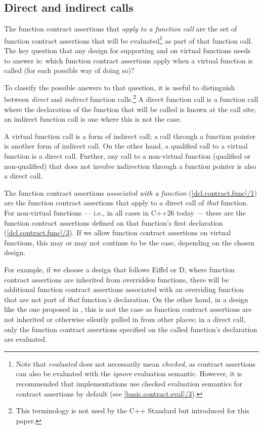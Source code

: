 \subsection{Direct and indirect calls}

The function contract assertions that \emph{apply to a function call} are the set of function contract assertions that will be evaluated\footnote{Note that \emph{evaluated} does not necessarily mean \emph{checked}, as contract assertions can also be evaluated with the \emph{ignore} evaluation semantic. However, it is recommended that implementations use checked evaluation semantics for contract assertions by default (see \href{https://eel.is/c++draft/basic.contract\#eval-3}{[basic.contract.eval]/3}).} as part of that function call. The key question that any design for supporting  and  on virtual functions needs to answer is: which function contract assertions apply when a virtual function is called (for each possible way of doing so)?

To classify the possible answers to that question, it is useful to distinguish between \emph{direct} and \emph{indirect} function calls.\footnote{This terminology is not used by the C++ Standard but introduced for this paper.} A direct function call is a function call where the declaration of the function that will be called is known at the call site; an indirect function call is one where this is not the case.

A virtual function call is a form of indirect call; a call through a function pointer is another form of indirect call. On the other hand, a qualified call to a virtual function is a direct call. Further, any call to a non-virtual function (qualified or non-qualified) that does not involve indirection through a function pointer is also a direct call. 

The function contract assertions \emph{associated with a function} (\href{https://eel.is/c++draft/dcl.contract.func#1}{[dcl.contract.func]/1}) are the function contract assertions that apply to a direct call of \emph{that} function. For non-virtual functions  --- i.e., in all cases in C++26 today --- these are the function contract assertions defined on that function's first declaration (\href{https://eel.is/c++draft/dcl.contract.func#3.sentence-1}{[dcl.contract.func]/3}). If we allow function contract assertions on virtual functions, this may or may not continue to be the case, depending on the chosen design.

For example, if we choose a design that follows Eiffel or D, where function contract assertions are inherited from overridden functions, there will be additional function contract assertions associated with an overriding function that are not part of \emph{that} function's declaration. On the other hand, in a design like the one proposed in \cite{P3097R0}, this is not the case as function contract assertions are not inherited or otherwise silently pulled in from other places; in a direct call, only the function contract assertions specified on the called function's declaration are evaluated.

